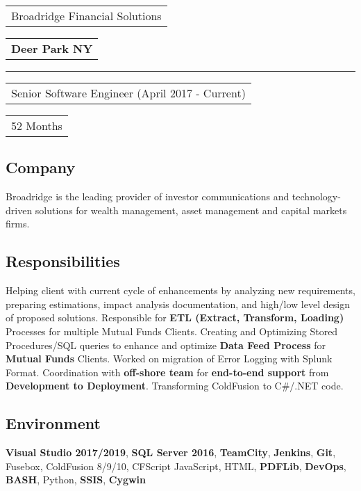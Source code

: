 \documentclass[letterpaper,11pt]{article}
\begin{document}

    \vspace{0.64cm}
    \noindent
    \begin{tabular}[t]{@{}l}
    \Large{Broadridge Financial Solutions}
    \end{tabular}
    \hfill
    \begin{tabular}[t]{l@{}}
    \textbf{Deer Park NY}
    \end{tabular}
    \noindent\rule{\textwidth}{0.5pt}
    \begin{tabular}[t]{@{}l}
    Senior Software Engineer (April 2017 - Current)
    \end{tabular}
    \hfill
    \begin{tabular}[t]{l@{}}
    52 Months
    \end{tabular}

    \subsection{Company}
    Broadridge is the leading provider of investor communications and technology-driven solutions for wealth management, asset management and capital markets firms.

    \subsection{Responsibilities}
    Helping client with current cycle of enhancements by analyzing new requirements, preparing estimations, impact analysis documentation, and high/low level design of proposed solutions. Responsible for \textbf{ETL (Extract, Transform, Loading)} Processes for multiple Mutual Funds Clients. Creating and Optimizing Stored Procedures/SQL queries to enhance and optimize \textbf{Data Feed Process} for \textbf{Mutual Funds} Clients. Worked on migration of Error Logging with Splunk Format. Coordination with \textbf{off-shore team} for \textbf{end-to-end support} from \textbf{Development to Deployment}. Transforming ColdFusion to C\#/.NET code.

    \subsection{Environment}
    \textbf{Visual Studio 2017/2019}, \textbf{SQL Server 2016}, \textbf{TeamCity}, \textbf{Jenkins}, \textbf{Git}, Fusebox,  ColdFusion 8/9/10, CFScript JavaScript, HTML, \textbf{PDFLib}, \textbf{DevOps}, \textbf{BASH}, Python, \textbf{SSIS}, \textbf{Cygwin}
\end{document}
